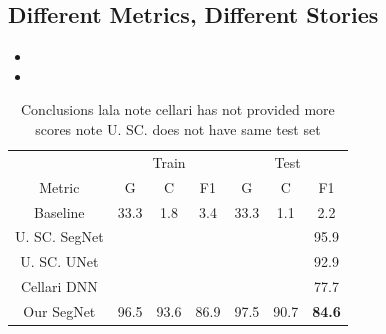 \documentclass[
]{dtuposter}
\begin{document}
\begin{dtupostercontent}
\section{Different Metrics, Different Stories}

\begin{itemize}
	\item 
	
	\item 
\end{itemize}

\begin{table}
	\begin{tabular}{c|ccc|ccc|}
		
		\rule[-1ex]{0pt}{2.5ex}  & \multicolumn{3}{c|}{Train} &  \multicolumn{3}{c|}{Test} \\ 
		
		\rule[-1ex]{0pt}{2.5ex} Metric  & G & C & F1 & G & C & F1 \\ 
		\hline
		\rule[-1ex]{0pt}{2.5ex} Baseline&  33.3 &1.8  &3.4  &33.3  &1.1  &2.2  \\ 
		
		\rule[-1ex]{0pt}{2.5ex} U. SC. SegNet    &  &  &  &  &  &95.9  \\ 
		\rule[-1ex]{0pt}{2.5ex} U. SC. UNet   &  &  &  &  &  &92.9  \\ 
		\rule[-1ex]{0pt}{2.5ex} Cellari DNN   &  &  &  &  &  &77.7  \\ 
		\hline 
		\rule[-1ex]{0pt}{2.5ex} Our SegNet & 96.5&93.6  & 86.9 &97.5  & 90.7  &\textbf{84.6}  \\ 
	\end{tabular} 
\caption{Conclusions lala note cellari has not provided more scores note U. SC. does not have same test set}
\end{table}





\end{dtupostercontent}
\end{document}
